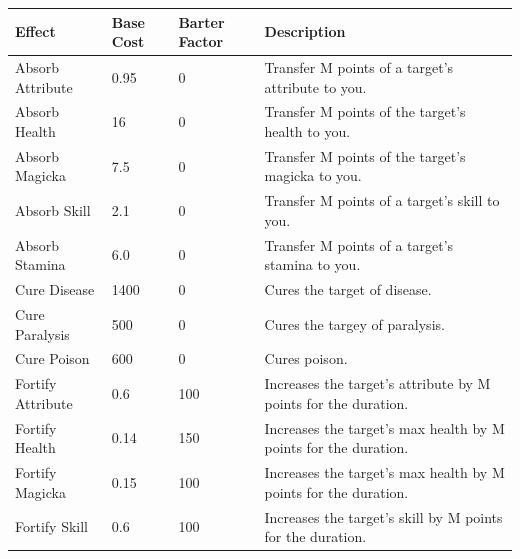 \documentclass[12pt]{book}
\begin{document}
\begin{tabular}{p{}|p{}|p{}|p{}}
Effect & Base Cost & Barter Factor & Description\\ \hline
Absorb Attribute & 0.95 & 0 & Transfer M points of a target's attribute to you.\\ \hline
Absorb Health & 16 & 0 & Transfer M points of the target's health to you.\\ \hline
Absorb Magicka & 7.5 & 0 & Transfer M points of the target's magicka to you.\\ \hline
Absorb Skill & 2.1 & 0 & Transfer M points of a target's skill to you.\\ \hline
Absorb Stamina & 6.0 & 0 & Transfer M points of a target's stamina to you.\\ \hline
Cure Disease & 1400 & 0 & Cures the target of disease.\\ \hline
Cure Paralysis & 500 & 0 & Cures the targey of paralysis.\\ \hline
Cure Poison & 600 & 0 & Cures poison.\\ \hline
Fortify Attribute & 0.6 & 100 & Increases the target's attribute by M points for the duration.\\ \hline
Fortify Health & 0.14 & 150 & Increases the target's max health by M points for the duration.\\ \hline
Fortify Magicka & 0.15 & 100 & Increases the target's max health by M points for the duration.\\ \hline
Fortify Skill & 0.6 & 100 & Increases the target's skill by M points for the duration.\\
\end{tabular}
\end{document}
